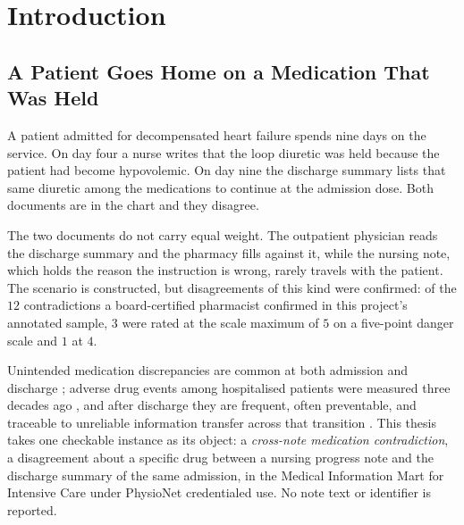 %
%
%

\chapter{Introduction}
\label{ch:intro}

\section{A Patient Goes Home on a Medication That Was Held}
\label{sec:intro-problem}

A patient admitted for decompensated heart failure spends nine days on the service. On day
four a nurse writes that the loop diuretic was held because the patient had become
hypovolemic. On day nine the discharge summary lists that same diuretic among the medications
to continue at the admission dose. Both documents are in the chart and they disagree.

The two documents do not carry equal weight. The outpatient physician reads the discharge
summary and the pharmacy fills against it, while the nursing note, which holds the reason the
instruction is wrong, rarely travels with the patient. The scenario is constructed, but
disagreements of this kind were confirmed: of the $12$ contradictions a board-certified
pharmacist confirmed in this project's annotated sample, $3$ were rated at the scale maximum
of $5$ on a five-point danger scale and $1$ at $4$.

Unintended medication discrepancies are common at both admission and discharge
\citep{cornish2005discrepancies,wong2008reconciliation}; adverse drug events among hospitalised
patients were measured three decades ago \citep{bates1995ade}, and after discharge they are
frequent, often preventable, and traceable to unreliable information transfer across that
transition \citep{forster2003adverse,moore2003discontinuity,kripalani2007deficits}. This thesis
takes one checkable instance as its object: a \emph{cross-note medication contradiction}, a
disagreement about a specific drug between a nursing progress note and the discharge summary of
the same admission, in the Medical Information Mart for Intensive Care
\citep[MIMIC-III;][]{johnson2016mimic} under PhysioNet credentialed use. No note text or identifier is reported.

